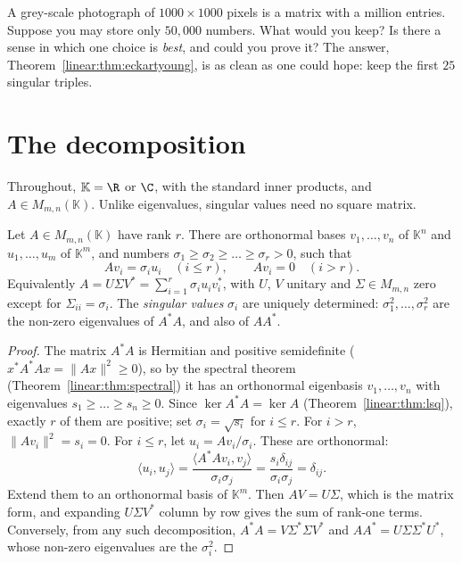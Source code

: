 \begin{think}
A grey-scale photograph of $1000\times1000$ pixels is a matrix with a million entries. Suppose you may store only
$50{,}000$ numbers. What would you keep? Is there a sense in which one choice is \emph{best}, and could you prove it? The
answer, Theorem~\ref{linear:thm:eckartyoung}, is as clean as one could hope: keep the first $25$ singular triples.
\end{think}

\section{The decomposition}

Throughout, $\mathbb K=\R$ or $\C$, with the standard inner products, and $A\in M_{m,n}(\mathbb K)$. Unlike eigenvalues,
singular values need no square matrix.

\begin{theorem}\label{linear:thm:svd}
Let $A\in M_{m,n}(\mathbb K)$ have rank $r$. There are orthonormal bases $v_1,\dots,v_n$ of $\mathbb K^n$ and
$u_1,\dots,u_m$ of $\mathbb K^m$, and numbers $\sigma_1\ge\sigma_2\ge\dots\ge\sigma_r>0$, such that
\[
Av_i=\sigma_iu_i\quad(i\le r),\qquad Av_i=0\quad(i>r).
\]
Equivalently $A=U\Sigma V^*=\sum_{i=1}^r\sigma_iu_iv_i^*$, with $U$, $V$ unitary and $\Sigma\in M_{m,n}$ zero except for
$\Sigma_{ii}=\sigma_i$. The \emph{singular values} $\sigma_i$ are uniquely determined: $\sigma_1^2,\dots,\sigma_r^2$ are the
non-zero eigenvalues of $A^*A$, and also of $AA^*$.
\end{theorem}
\begin{proof}
The matrix $A^*A$ is Hermitian and positive semidefinite ($x^*A^*Ax=\|Ax\|^2\ge0$), so by the spectral theorem
(Theorem~\ref{linear:thm:spectral}) it has an orthonormal eigenbasis $v_1,\dots,v_n$ with eigenvalues $s_1\ge\dots\ge s_n\ge0$.
Since $\ker A^*A=\ker A$ (Theorem~\ref{linear:thm:lsq}), exactly $r$ of them are positive; set $\sigma_i=\sqrt{s_i}$ for $i\le r$.
For $i>r$, $\|Av_i\|^2=s_i=0$. For $i\le r$, let $u_i=Av_i/\sigma_i$. These are orthonormal:
\[
\langle u_i,u_j\rangle=\frac{\langle A^*Av_i,v_j\rangle}{\sigma_i\sigma_j}=\frac{s_i\delta_{ij}}{\sigma_i\sigma_j}=\delta_{ij}.
\]
Extend them to an orthonormal basis of $\mathbb K^m$. Then $AV=U\Sigma$, which is the matrix form, and expanding $U\Sigma V^*$
column by row gives the sum of rank-one terms. Conversely, from any such decomposition, $A^*A=V\Sigma^*\Sigma V^*$ and
$AA^*=U\Sigma\Sigma^*U^*$, whose non-zero eigenvalues are the $\sigma_i^2$.
\end{proof}

